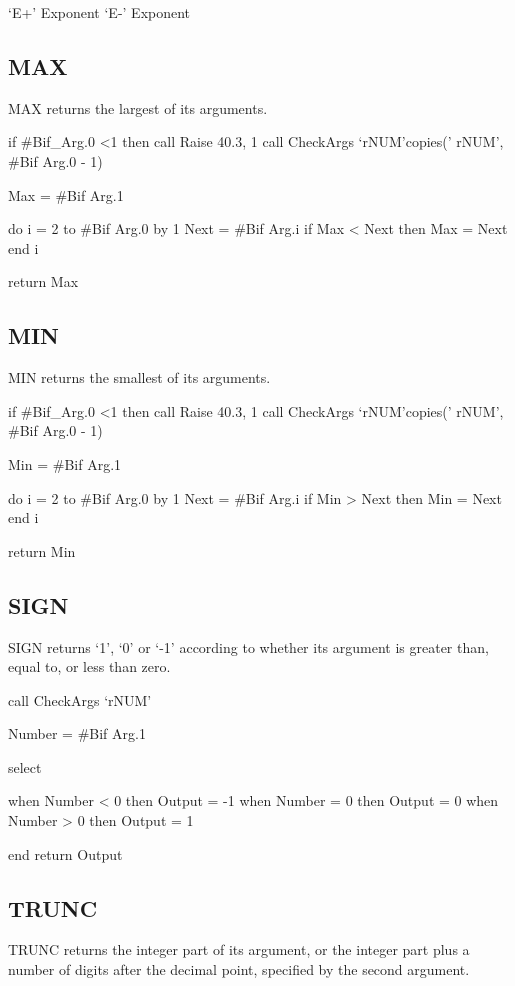 `E+' Exponent `E-' Exponent

\subsection{MAX}\label{max}

MAX returns the largest of its arguments.

if \#Bif\_Arg.0 \textless1 then call Raise 40.3, 1 call CheckArgs
`rNUM'\textbar\textbar copies(' rNUM', \#Bif Arg.0 - 1)

Max = \#Bif Arg.1

do i = 2 to \#Bif Arg.0 by 1 Next = \#Bif Arg.i if Max \textless{} Next
then Max = Next end i

return Max

\subsection{MIN}\label{min}

MIN returns the smallest of its arguments.

if \#Bif\_Arg.0 \textless1 then call Raise 40.3, 1 call CheckArgs
`rNUM'\textbar\textbar copies(' rNUM', \#Bif Arg.0 - 1)

Min = \#Bif Arg.1

do i = 2 to \#Bif Arg.0 by 1 Next = \#Bif Arg.i if Min \textgreater{}
Next then Min = Next end i

return Min

\subsection{SIGN}\label{sign}

SIGN returns `1', `0' or `-1' according to whether its argument is
greater than, equal to, or less than zero.

call CheckArgs `rNUM'

Number = \#Bif Arg.1

select

when Number \textless{} 0 then Output = -1 when Number = 0 then Output =
0 when Number \textgreater{} 0 then Output = 1

end return Output

\subsection{TRUNC}\label{trunc}

TRUNC returns the integer part of its argument, or the integer part plus
a number of digits after the decimal point, specified by the second
argument.

